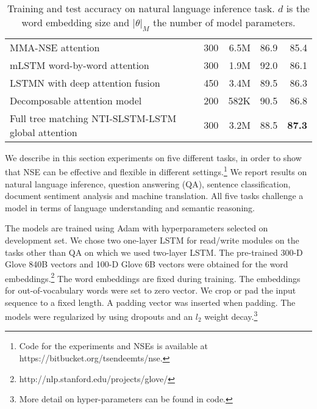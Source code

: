 \documentclass{article}
\begin{document}
\begin{table*}[t]
\begin{center}
\begin{tabular}{c|c|c|c|c}
\multicolumn{1}{l|}{MMA-NSE attention} & \multicolumn{1}{|r|}{300} & \multicolumn{1}{|r|}{6.5M} & \multicolumn{1}{|r|}{86.9} & \multicolumn{1}{|r}{85.4} \\ \multicolumn{1}{l|}{mLSTM word-by-word attention \cite{WangJ15b}} & \multicolumn{1}{|r|}{300} & \multicolumn{1}{|r|}{1.9M} & \multicolumn{1}{|r|}{92.0} & \multicolumn{1}{|r}{86.1} \\
\multicolumn{1}{l|}{LSTMN with deep attention fusion \cite{ChengDL16}} & \multicolumn{1}{|r|}{450} & \multicolumn{1}{|r|}{3.4M} & \multicolumn{1}{|r|}{89.5} & \multicolumn{1}{|r}{86.3} \\
\multicolumn{1}{l|}{Decomposable attention model \cite{parikh2016decomposable}} & \multicolumn{1}{|r|}{200} & \multicolumn{1}{|r|}{582K} & \multicolumn{1}{|r|}{90.5} & \multicolumn{1}{|r}{86.8} \\
\multicolumn{1}{l|}{Full tree matching NTI-SLSTM-LSTM global attention \cite{munkhdalai2016neural}} & \multicolumn{1}{|r|}{300} & \multicolumn{1}{|r|}{3.2M} & \multicolumn{1}{|r|}{88.5} & \multicolumn{1}{|r}{\textbf{87.3}} \\
\hline
\end{tabular}
\end{center}
\caption{\label{table:snli}Training and test accuracy on natural language inference task. $d$ is the word embedding size and $|\theta|_M$ the number of model parameters.}
\end{table*}

We describe in this section experiments on five different tasks, in order to show that NSE can be effective and flexible in different settings.\footnote{Code for the experiments and NSEs is available at https://bitbucket.org/tsendeemts/nse.} We report results on natural language inference, question answering (QA), sentence classification, document sentiment analysis and machine translation. All five tasks challenge a model in terms of language understanding and semantic reasoning. 

The models are trained using Adam \cite{kingma:14} with hyperparameters selected on development set. We chose two one-layer LSTM for read/write modules on the tasks other than QA on which we used two-layer LSTM. The pre-trained 300-D Glove 840B vectors and 100-D Glove 6B vectors \cite{pennington:14} were obtained for the word embeddings.\footnote{http://nlp.stanford.edu/projects/glove/} The word embeddings are fixed during training. The embeddings for out-of-vocabulary words were set to zero vector. We crop or pad the input sequence to a fixed length. A padding vector was inserted when padding. The models were regularized by using dropouts and an $l_2$ weight decay.\footnote{More detail on hyper-parameters can be found in code.}
\end{document}
